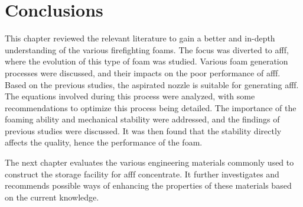\section{Conclusions}
This chapter reviewed the relevant literature to gain a better and in-depth understanding of the various firefighting foams. The focus was diverted to \acrshort{afff}, where the evolution of this type of foam was studied. Various foam generation processes were discussed, and their impacts on the poor performance of \acrshort{afff}. Based on the previous studies, the aspirated nozzle is suitable for generating \acrshort{afff}. The equations involved during this process were analyzed, with some recommendations to optimize this process being detailed. The importance of the foaming ability and mechanical stability were addressed, and the findings of previous studies were discussed. It was then found that the stability directly affects the quality, hence the performance of the foam.

The next chapter evaluates the various engineering materials commonly used to construct the storage facility for \acrshort{afff} concentrate. It further investigates and recommends possible ways of enhancing the properties of these materials based on the current knowledge.